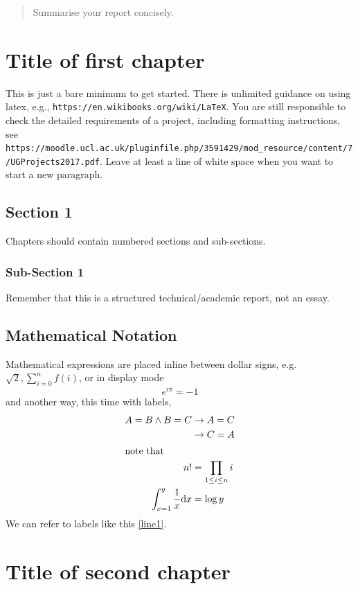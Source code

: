 
 
\onehalfspacing
\maketitle
\begin{abstract}
Summarise your report concisely.
\end{abstract}
\tableofcontents
\setcounter{page}{1}


\chapter{Title of first chapter}
This is just a bare minimum to get started.  There is unlimited guidance on using latex, e.g., {\tt https://en.wikibooks.org/wiki/LaTeX}.   You are still responsible to check the detailed requirements of a project, including formatting instructions, see \\
{\tt https://moodle.ucl.ac.uk/pluginfile.php/3591429/mod\_resource/content/7/UGProjects2017.pdf}.
Leave at least a line of white space when you want to start a new paragraph.

\section{Section 1}
Chapters should contain numbered sections and sub-sections.

\subsection{Sub-Section 1}
Remember that this is a structured technical/academic report, not an essay.

\section{Mathematical Notation}
Mathematical expressions are placed inline between dollar signs, e.g. $\sqrt 2, \sum_{i=0}^nf(i)$, or in display mode
\[ e^{i\pi}=-1\] and another way, this time with labels,
\begin{align}
\label{line1} A=B\wedge B=C&\rightarrow A=C\\
&\rightarrow C=A\\
\intertext{note that}
n!&=\prod_{1\leq i\leq n}i \\
\int_{x=1}^y \frac 1 x \mathrm{d}x&=\log y
\end{align}
We can refer to labels like this \eqref{line1}.   

\chapter{Title of second chapter}

